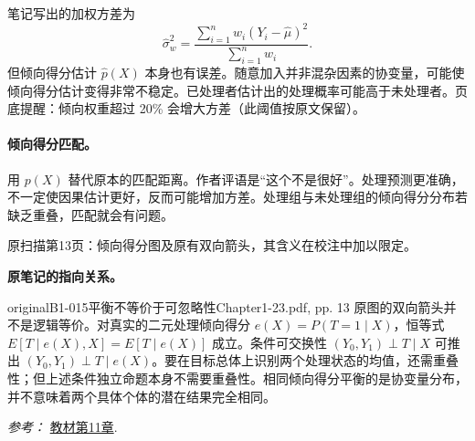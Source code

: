 {笔记写出的加权方差为
\[\hat\sigma_w^2=\frac{\sum_{i=1}^n w_i(Y_i-\hat\mu)^2}{\sum_{i=1}^n w_i}.\]
但倾向得分估计 $\hat p(X)$ 本身也有误差。随意加入并非混杂因素的协变量，可能使倾向得分估计变得非常不稳定。已处理者估计出的处理概率可能高于未处理者。页底提醒：倾向权重超过 20\% 会增大方差（此阈值按原文保留）。

\paragraph{倾向得分匹配。}
用 $p(X)$ 替代原本的匹配距离。作者评语是“这个不是很好”。处理预测更准确，不一定使因果估计更好，反而可能增加方差。处理组与未处理组的倾向得分分布若缺乏重叠，匹配就会有问题。

\begin{center}
\par{\small 原扫描第13页：倾向得分图及原有双向箭头，其含义在校注中加以限定。}
\end{center}
\par{}\smallskip\textbf{原笔记的指向关系。}\par\smallskip
{}
\begin{reviewnote}{original}{B1-015}{平衡不等价于可忽略性}{Chapter1-23.pdf, pp. 13}
原图的双向箭头并不是逻辑等价。对真实的二元处理倾向得分 $e(X)=P(T=1\mid X)$，恒等式 $E[T\mid e(X),X]=E[T\mid e(X)]$ 成立。条件可交换性 $(Y_0,Y_1)\perp T\mid X$ 可推出 $(Y_0,Y_1)\perp T\mid e(X)$。要在目标总体上识别两个处理状态的均值，还需重叠性；但上述条件独立命题本身不需要重叠性。相同倾向得分平衡的是协变量分布，并不意味着两个具体个体的潜在结果完全相同。
\par\smallskip\textit{参考：} \href{https://matheusfacure.github.io/python-causality-handbook/11-Propensity-Score.html}{教材第11章}.
\end{reviewnote}

}
